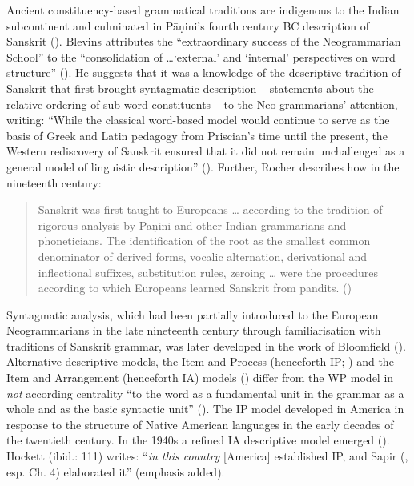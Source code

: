 Ancient constituency-based grammatical traditions are indigenous to the Indian subcontinent and culminated in Pāṇini’s fourth century BC description of Sanskrit (\citealt[375]{blevins_word-based_2013}). Blevins attributes the “extraordinary success of the Neogrammarian School” to the “consolidation of …`external' and `internal' perspectives on word structure” (\citealt[382]{blevins_word-based_2013}). He suggests that it was a knowledge of the descriptive tradition of Sanskrit that first brought syntagmatic description – statements about the relative ordering of sub-word constituents – to the Neo-grammarians' attention, writing: “While the classical word-based model would continue to serve as the basis of Greek and Latin pedagogy from Priscian’s time until the present, the Western rediscovery of Sanskrit ensured that it did not remain unchallenged as a general model of linguistic description” (\citealt[382]{blevins_word-based_2013}). Further, Rocher describes how in the nineteenth century: 

\begin{quote}
    Sanskrit was first taught to Europeans … according to the tradition of rigorous analysis by Pāṇini and other Indian grammarians and phoneticians. The identification of the root as the smallest common denominator of derived forms, vocalic alternation, derivational and inflectional suffixes, substitution rules, zeroing … were the procedures according to which Europeans learned Sanskrit from pandits. (\citealt[748]{rocher_sanskrit_nodate})
\end{quote}

Syntagmatic analysis, which had been partially introduced to the European Neogrammarians in the late nineteenth century through familiarisation with traditions of Sanskrit grammar, was later developed in the work of Bloomfield (\citealt[382--5]{blevins_word-based_2013}). Alternative descriptive models, the Item and Process (henceforth IP; \citealt[128]{hockett_two_1954}) and the Item and Arrangement (henceforth IA) models (\citealt[114]{hockett_two_1954}) differ from the WP model in \textit{not} according centrality “to the word as a fundamental unit in the grammar as a whole and as the basic syntactic unit” (\citealt[118]{Robins_1959}). The IP model developed in America in response to the structure of Native American languages in the early decades of the twentieth century. In the 1940s a refined IA descriptive model emerged (\citealt[112]{hockett_two_1954}). Hockett (ibid.: 111) writes: ``\textit{in this country} [America] \citet[27f.]{boas_handbook_1911} established IP, and Sapir (\citealt{sapir_1921}, esp. Ch. 4) elaborated it'' (emphasis added). 

